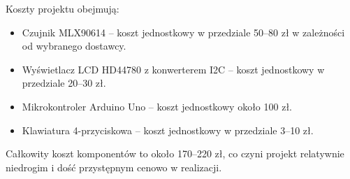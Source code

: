 Koszty projektu obejmują: 

\begin{itemize}
    \item Czujnik MLX90614 – koszt jednostkowy w przedziale 50–80 zł w zależności od wybranego dostawcy.
    \item Wyświetlacz LCD HD44780 z konwerterem I2C – koszt jednostkowy w przedziale 20–30 zł.
    \item Mikrokontroler Arduino Uno – koszt jednostkowy około 100 zł.
    \item Klawiatura 4-przyciskowa – koszt jednostkowy w przedziale 3–10 zł. 
\end{itemize}

Całkowity koszt komponentów to około 170–220 zł, co czyni projekt relatywnie niedrogim i dość przystępnym cenowo w realizacji.